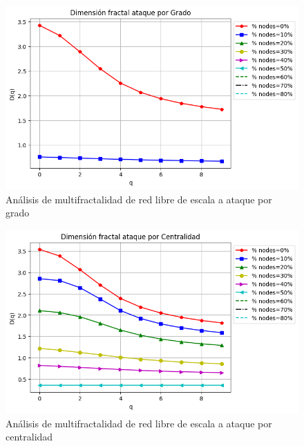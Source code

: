 \begin{figure}[H]
    \centering
    \includegraphics[scale=0.7]{Capitulo6MultifractalidadYRobustez/imagenes/grafica_DqDegree20180512_143117ScaleFree8000Nodes.png}
    \caption{Análisis de multifractalidad de red libre de escala a ataque por grado }
    \label{fig:multfractascalefree}
\end{figure}

\begin{figure}[H]
    \centering
    \includegraphics[scale=0.7]{Capitulo6MultifractalidadYRobustez/imagenes/grafica_DqCentrality20180512_143117ScaleFree8000Nodes.png}
    \caption{Análisis de multifractalidad de red libre de escala a ataque por centralidad }
\end{figure}


